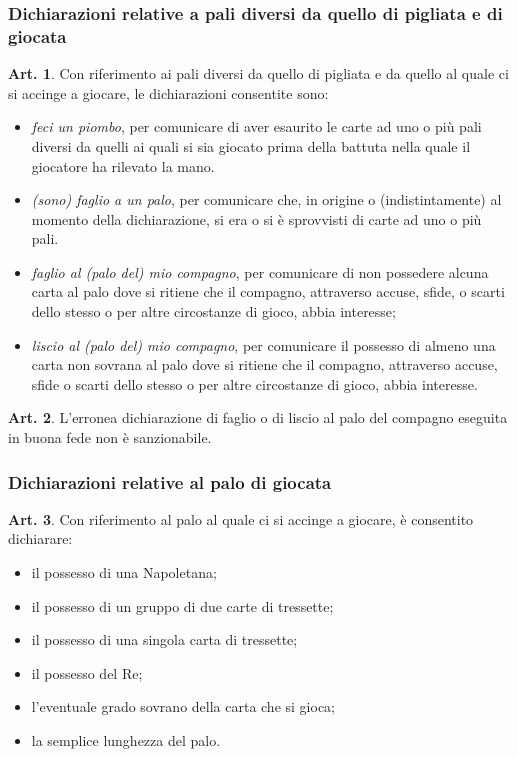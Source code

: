 \documentclass[italian,a4paper]{book}
\theoremstyle{definition}
\newtheorem{art}{Art.}
\newenvironment{packeditem}{
\begin{itemize}
  \setlength{\itemsep}{1pt}
  \setlength{\parskip}{0pt}
  \setlength{\parsep}{0pt}
}{\end{itemize}}
\begin{document}
\subsubsection{Dichiarazioni relative a pali diversi da quello di pigliata e
di giocata}
\begin{art}
    Con riferimento ai pali diversi da quello di pigliata e da quello al quale ci si accinge a giocare, le dichiarazioni consentite sono:
    \begin{packeditem}
\item      \emph{feci un piombo}, per comunicare di aver esaurito le carte ad uno o più pali diversi da quelli ai quali si sia giocato prima della battuta nella quale il giocatore ha rilevato la mano.
\item      \emph{(sono) faglio a un palo}, per comunicare che, in origine o (indistintamente) al momento della dichiarazione, si era o si è sprovvisti di carte ad uno o più pali.
\item      \emph{faglio al (palo del) mio compagno}, per comunicare di non possedere alcuna carta al palo dove si ritiene che il compagno, attraverso accuse, sfide, o scarti dello stesso o per altre circostanze di gioco, abbia interesse; 
\item      \emph{liscio al (palo del)  mio compagno}, per comunicare il possesso di almeno una carta non sovrana al palo dove si ritiene che il compagno, attraverso accuse, sfide o scarti dello stesso o per altre circostanze di gioco, abbia interesse.
    \end{packeditem}
\end{art}
\begin{art}
    L'erronea dichiarazione di faglio o di liscio al palo del compagno eseguita in buona fede non è sanzionabile.
\end{art}
\subsubsection{Dichiarazioni relative al palo di giocata}
\begin{art}
    Con riferimento al palo al quale ci si accinge a giocare, è consentito dichiarare:
    \begin{packeditem}
\item      il possesso di una Napoletana;
\item      il possesso di un gruppo di due carte di tressette;
\item      il possesso di una singola carta di tressette;
\item      il possesso del Re;
\item      l'eventuale grado sovrano della carta che si gioca;
\item        la semplice lunghezza del palo.
    \end{packeditem}
\end{art}
\end{document}
